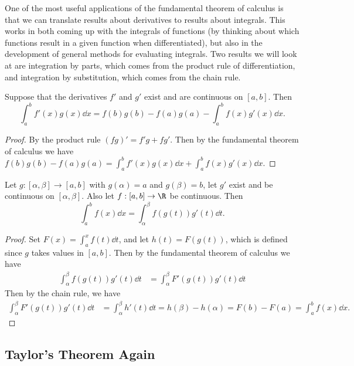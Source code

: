 One of the most useful applications of the fundamental theorem of calculus is that we can translate results about derivatives to results about integrals. This works in both coming up with the integrals of functions (by thinking about which functions result in a given function when differentiated), but also in the development of general methods for evaluating integrals. Two results we will look at are integration by parts, which comes from the product rule of differentiation, and integration by substitution, which comes from the chain rule.

\begin{corollary}
	Suppose that the derivatives $f'$ and $g'$ exist and are continuous on $[a, b]$. Then
	$$
	\int_a^b f'(x)g(x) \dd x = f(b)g(b) - f(a)g(a) - \int_a^b f(x)g'(x) \dd x.
	$$
\end{corollary}
\begin{proof}
	By the product rule $(fg)' = f'g + fg'$. Then by the fundamental theorem of calculus we have
	$
	f(b)g(b) - f(a)g(a) = \int_a^b f'(x)g(x) \dd x + \int_a^b f(x) g'(x) \dd x.
 	$
\end{proof}

\begin{corollary}
	Let $g:[\alpha, \beta] \rightarrow [a, b]$ with $g(\alpha) = a$ and $g(\beta) = b$, let $g'$ exist and be continuous on $[\alpha, \beta]$. Also let $f:[a, b] \rightarrow \R$ be continuous. Then
	$$
	\int_a^b f(x) \dd x = \int_{\alpha}^{\beta} f(g(t)) g'(t) \dd t.
	$$
\end{corollary}
\begin{proof}
	Set $F(x) = \int_a^x f(t) \dd t$, and let $h(t) = F(g(t))$, which is defined since $g$ takes values in $[a, b]$. Then by the fundamental theorem of calculus we have
	\begin{align*}
		\int_{\alpha}^{\beta} f(g(t)) g'(t) \dd t &= \int_{\alpha}^{\beta} F'(g(t)) g'(t) \dd t
	\end{align*}
	Then by the chain rule, we have
	\begin{align*}
		\int_{\alpha}^{\beta} F'(g(t)) g'(t) \dd t &= \int_{\alpha}^{\beta} h'(t) \dd t = h(\beta) - h(\alpha) = F(b) - F(a) = \int_a^b f(x) \dd x.
	\end{align*}
\end{proof}

\subsection{Taylor's Theorem Again}

